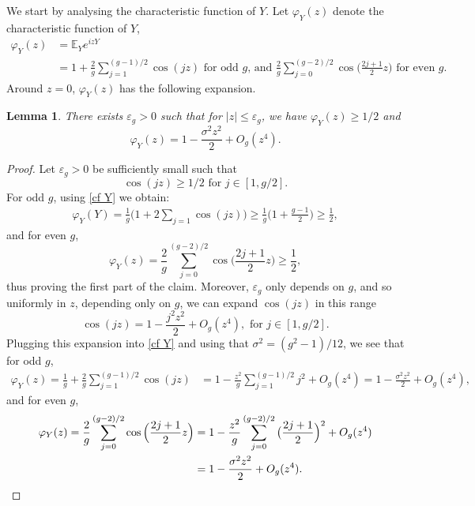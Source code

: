 \documentclass[hidelinks,11pt,reqno]{amsart}
\renewcommand{\leq}{\leqslant}
\renewcommand{\geq}{\geqslant}
\newcommand{\E}{\ensuremath{\mathbb{E}}}
\newcommand{\cf}{\varphi_{Y}}
\newtheorem{lemma}[prop]{Lemma}
\theoremstyle{remark}
\begin{document}
We start by analysing the characteristic function of $Y$. Let $\cf(z)$ denote the characteristic function of $Y$, 
           \begin{align}
     \cf(z)&=\E_{Y} e^{izY}\nonumber\\
&=  1+\frac{2}{g}\sum_{j=1}^{(g-1)/2}\cos(jz)\textrm{ for odd }g \textrm{, and }\frac{2}{g}\sum_{j=0}^{(g-2)/2}\cos\Big (\frac{2j+1}{2}z\Big)\textrm{ for even }g.\label{cf Y}
\end{align} 
Around $z=0$, $\cf(z)$ has the following expansion.
\begin{lemma}\label{cf near zero}
        There exists $\varepsilon_{g}>0$ such that for $|z|\leq \varepsilon_{g}$, we have $\cf(z)\geq 1/2$ and 
        \begin{equation*}
            \cf(z)=1-\frac{\sigma^{2}z^{2}}{2}+O_{g}(z^{4}).
        \end{equation*}
    \end{lemma}
    \begin{proof}
        Let $\varepsilon_{g}>0$ be sufficiently small such that 
        \[\cos (jz)\geq 1/2 \textrm{ for }j\in [1,g/2]. \]
        For odd $g$, using \cref{cf Y} we obtain:
        \begin{align*}
            \cf(Y)=\frac{1}{g}\Big (1+2\sum_{j=1}\cos(jz) \Big)\geq \frac{1}{g}\Big (1+\frac{g-1}{2}\Big )\geq \frac{1}{2},
        \end{align*}
       and for even $g$,
\[\cf(z)=\frac{2}{g}\sum_{j=0}^{(g-2)/2}\cos\Big (\frac{2j+1}{2}z\Big)\geq \frac{1}{2},\]
thus proving the first part of the claim. Moreover, $\varepsilon_{g}$ only depends on $g$, and so uniformly in $z$, depending only on $g$, we can expand $\cos(jz)$ in this range 
        \[\cos(jz)=1-\frac{j^{2}z^{2}}{2}+O_{g}(z^{4}), \textrm{ for }j\in [1,g/2].\]
         Plugging this expansion into \cref{cf Y} and using that $\sigma^{2}=(g^{2}-1)/12$, we see that for odd $g$,
         \begin{align*}
             \cf(z)=\frac{1}{g}+\frac{2}{g}\sum_{j=1}^{(g-1)/2}\cos(jz)&=1-\frac{z^{2}}{g}\sum_{j=1}^{(g-1)/2}j^{2}+O_{g}(z^{4})=1-\frac{\sigma^{2}z^{2}}{2}+O_{g}(z^{4}),
         \end{align*}
         and for even $g$,
         \begin{align*}
             \cf(z)=\frac{2}{g}\sum_{j=0}^{(g-2)/2}\cos\Big (\frac{2j+1}{2}z\Big)&=1-\frac{z^{2}}{g}\sum_{j=0}^{(g-2)/2}\big(\frac{2j+1}{2}\Big)^{2}+O_{g}(z^{4})\\
             &=1-\frac{\sigma^{2}z^{2}}{2}+O_{g}(z^{4}).\qedhere
         \end{align*}
    \end{proof}
\end{document}
